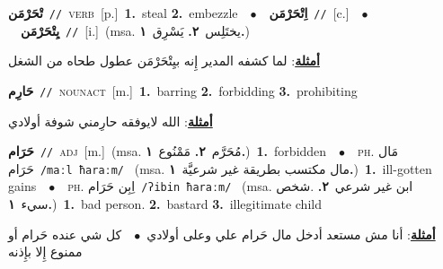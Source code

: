 \documentclass[10pt,a4paper,twoside]{article} %
\begin{document}
\begin{multicols}{2}
{\setlength\topsep{0pt}\textbf{\foreignlanguage{arabic}{تْحَرْمَن}}\ {\color{gray}\texttt{//}\color{black}}\ \textsc{verb}\ [p.]\ \textbf{1.}~steal  \textbf{2.}~embezzle\ \ $\bullet$\ \ \setlength\topsep{0pt}\textbf{\foreignlanguage{arabic}{اِتْحَرْمَن}}\ {\color{gray}\texttt{//}\color{black}}\ [c.]\ \ $\bullet$\ \ \setlength\topsep{0pt}\textbf{\foreignlanguage{arabic}{يِتْحَرْمَن}}\ {\color{gray}\texttt{//}\color{black}}\ [i.]\ \color{gray}(msa. \foreignlanguage{arabic}{يختَلِس}~\foreignlanguage{arabic}{\textbf{٢.}}  \foreignlanguage{arabic}{يَسْرِق}~\foreignlanguage{arabic}{\textbf{١.}})\color{black}\  \begin{flushright}\color{gray}\foreignlanguage{arabic}{\textbf{\underline{\foreignlanguage{arabic}{أمثلة}}}: لما كشفه المدير إِنه بيِتْحَرْمَن عطول طحاه من الشغل}\end{flushright}\color{black}} \vspace{2mm}

{\setlength\topsep{0pt}\textbf{\foreignlanguage{arabic}{حَارِم}}\ {\color{gray}\texttt{//}\color{black}}\ \textsc{noun\textunderscore act}\ [m.]\ \textbf{1.}~barring  \textbf{2.}~forbidding  \textbf{3.}~prohibiting\  \begin{flushright}\color{gray}\foreignlanguage{arabic}{\textbf{\underline{\foreignlanguage{arabic}{أمثلة}}}: الله لايوفقه حارِمني شوفة أولادي}\end{flushright}\color{black}} \vspace{2mm}

{\setlength\topsep{0pt}\textbf{\foreignlanguage{arabic}{حَرَام}}\ {\color{gray}\texttt{//}\color{black}}\ \textsc{adj}\ [m.]\ \color{gray}(msa. \foreignlanguage{arabic}{مُحَرَّم}~\foreignlanguage{arabic}{\textbf{٢.}}  \foreignlanguage{arabic}{مَمْنُوع}~\foreignlanguage{arabic}{\textbf{١.}})\color{black}\ \textbf{1.}~forbidden\ \ $\bullet$\ \ \textsc{ph.} \color{gray} \foreignlanguage{arabic}{مَال حَرَام}\color{black}\ {\color{gray}\texttt{/{\sffamily maːl ħaraːm}/}\color{black}}\ \color{gray} (msa. \foreignlanguage{arabic}{مال مكتسب بطريقة غير شرعيَّة}~\foreignlanguage{arabic}{\textbf{١.}})\color{black}\ \textbf{1.}~ill-gotten gains\ \ $\bullet$\ \ \textsc{ph.} \color{gray} \foreignlanguage{arabic}{اِبِن حَرَام}\color{black}\ {\color{gray}\texttt{/{\sffamily ʔibin ħaraːm}/}\color{black}}\ \color{gray} (msa. \foreignlanguage{arabic}{ابن غير شرعي}~\foreignlanguage{arabic}{\textbf{٢.}}  .\foreignlanguage{arabic}{شخص سيء}~\foreignlanguage{arabic}{\textbf{١.}})\color{black}\ \textbf{1.}~bad person.  \textbf{2.}~bastard  \textbf{3.}~illegitimate child\  \begin{flushright}\color{gray}\foreignlanguage{arabic}{\textbf{\underline{\foreignlanguage{arabic}{أمثلة}}}: أنا مش مستعد أدخل مال حَرام علي وعلى أولادي\ $\bullet$\ \  كل شي عنده حَرام أو ممنوع إِلا بإِذنه}\end{flushright}\color{black}} \vspace{2mm}


\end{multicols}
\end{document}

